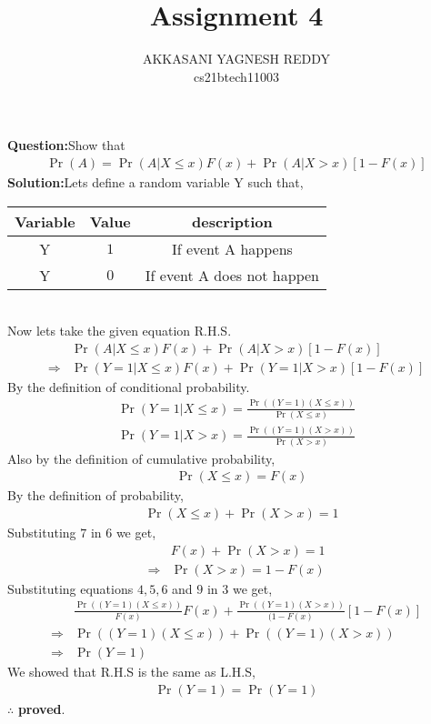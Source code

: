 \documentclass[journal,12pt,twocolumn]{IEEEtran}
\title{Assignment 4}
\author{AKKASANI YAGNESH REDDY \\
     cs21btech11003 \\}
\providecommand{\pr}[1]{\ensuremath{\Pr\left(#1\right)}}
\begin{document}
     \maketitle
     \textbf{Question:}Show that
     \begin{align}
         \pr{A}=\pr{A|X\leq x}F(x)+\pr{A|X>x}[1-F(x)]
         \end{align}
\textbf{Solution:}Lets define a random variable Y such that,
\begin{table}[h!]
    \begin{tabular}{|c|c|c|} \hline
    \textbf{Variable} & \textbf{Value} & \textbf{description} \\ \hline
    Y  & $1$ & If event A happens \\ \hline
    Y  & $0$ & If event A does not happen \\ \hline
    \end{tabular}
    \end{table}\\
Now lets take the given equation R.H.S.
\begin{align}
         &\pr{A|X\leq x}F(x)+\pr{A|X>x}[1-F(x)]\\
         \Rightarrow &\pr{Y=1|X\leq x}F(x)+\pr{Y=1|X>x}[1-F(x)]
 \end{align}
By the definition of conditional probability.\\
\begin{align}
    \pr{Y=1|X\leq x}=\frac{\pr{(Y=1)(X\leq x)}}{\pr{X\leq x}} \\
    \pr{Y=1|X>x}=\frac{\pr{(Y=1)(X>x)}}{\pr{X>x}}
\end{align}
Also by the definition of cumulative probability,
\begin{align}
    &\pr{X \leq x}=F(x) 
    \end{align}
By the definition of probability,    
    \begin{align}
    &\pr{X \leq x}+\pr{X>x}=1 
    \end{align}
   Substituting $7$ in $6$ we get,
\begin{align}
    &F(x)+\pr{X>x}=1 \\
    \Rightarrow &\pr{X>x}=1-F(x) 
\end{align}
Substituting equations $4,5,6$ and $9$ in 3 we get,
\begin{align}
&\frac{\pr{(Y=1)(X\leq x)}}{F(x)}F(x)+ \frac{\pr{(Y=1)(X>x)}}{(1-F(x)}[1-F(x)] \\
\Rightarrow &\pr{(Y=1)(X\leq x)} + \pr{(Y=1)(X>x)}\\
\Rightarrow&\pr{Y=1}
\end{align}
\newpage
We showed that R.H.S is the same as L.H.S,
\begin{align}
    \pr{Y=1}=\pr{Y=1}
\end{align}
       \centering
       $\therefore$ \textbf{proved}.
\end{document}
